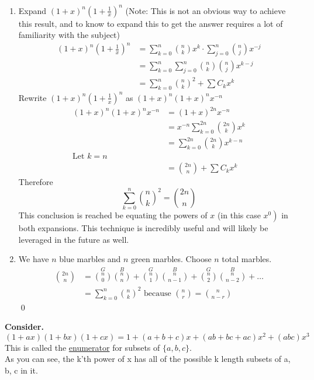 \begin{enumerate}
    \item Expand $(1+x)^{n}\left(1+\frac{1}{x}\right)^{n}$ (Note: This is not an obvious way to achieve this result, and to know to expand this to get the answer requires a lot of familiarity with the subject)
    \begin{align*}
        (1+x)^{n}\left(1+\frac{1}{x}\right)^{n} & =\sum_{k=0}^{n} \binom n k x^k \cdot \sum_{j=0}^n \binom n j x^{-j}\\
        &= \sum_{k=0}^n \sum_{j=0}^n \binom n k \binom n j x^{k-j} \\
        &= \sum_{k=0}^n \binom n k ^2 + \sum C_k x^k 
    \end{align*}
    Rewrite $(1+x)^{n}\left(1+\frac{1}{x}\right)^{n}$ as $(1+x)^{n}(1+x)^{n} x^{-n}$
\begin{align*}
    (1+x)^{n}(1+x)^{n} x^{-n} & =(1+x)^{2 n} x^{-n} \\
& =x^{-n} \sum_{k=0}^{2 n} \binom{2n}k x^k \\ 
&= \sum_{k=0}^{2n} \binom {2n}k x^{k-n}\\
\text{Let } k = n&\\
&= \binom{2n}n + \sum C_k x^k 
\end{align*}
  Therefore 
\[ \sum_{k=0}^n \binom n k^2 = \binom{2n}n 
    \]
    This conclusion is reached be equating the powers of $x$ (in this case $\left.x^{0}\right)$ in both expansions. This technique is incredibly useful and will likely be leveraged in the future as well.
\item  We have $n$ blue marbles and $n$ green marbles. Choose $n$ total marbles.
\begin{align*}
    \binom{2n} n &= \overset{G}{\binom n 0} \overset{B}{\binom n n}
    + \overset{G}{\binom n 1} \overset{B}{\binom n {n-1}}
    + \overset{G}{\binom n 2} \overset{B}{\binom n {n-2}} + \dots \\
    &= \sum_{k=0}^n \binom n k ^2 \text{ because } \binom n r = \binom n {n-r}
\end{align*}
\qed
\end{enumerate}

 \textbf{Consider.}
\[
(1+a x)(1+b x)(1+c x)=1+(a+b+c) x+(a b+b c+a c) x^{2}+(a b c) x^{3}
\]
This is called the \underline{enumerator} for subsets of $\{a, b, c\}$. \\

  As you can see, the k'th power of x has all of the possible k length subsets of a, b, c in it. \\

